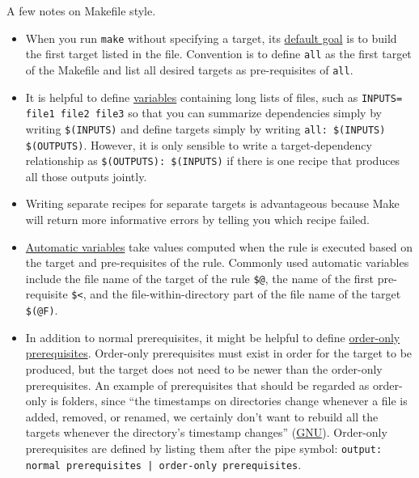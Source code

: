 A few notes on Makefile style.
\begin{itemize}
\item
When you run \texttt{make} without specifying a target,
its \href{https://www.gnu.org/software/make/manual/html_node/How-Make-Works.html#How-Make-Works}{default goal}
is to build the first target listed in the file.
Convention is to define \texttt{all} as the first target of the Makefile and list all desired targets as pre-requisites of \texttt{all}. 
\item It is helpful to define \href{https://www.gnu.org/software/make/manual/html_node/Variables-Simplify.html#Variables-Simplify}{variables} containing long lists of files, such as \texttt{INPUTS= file1 file2 file3}
so that you can summarize dependencies simply by writing \texttt{\$(INPUTS)}
and define targets simply by writing \texttt{all: \$(INPUTS) \$(OUTPUTS)}.
However, it is only sensible to write a target-dependency relationship as
\texttt{\$(OUTPUTS): \$(INPUTS)}
if there is one recipe that produces all those outputs jointly.
\item Writing separate recipes for separate targets is advantageous because Make will return more informative errors by telling you which recipe failed.
\item \href{https://www.gnu.org/software/make/manual/html_node/Automatic-Variables.html}{Automatic variables} take values computed when the rule is executed based on the target and pre-requisites of the rule.
Commonly used automatic variables include
the file name of the target of the rule \texttt{\$@},
the name of the first pre-requisite \texttt{\$<},
and
the file-within-directory part of the file name of the target \texttt{\$(@F)}.
\item In addition to normal prerequisites, it might be helpful to define \href{https://www.gnu.org/software/make/manual/html_node/Prerequisite-Types.html}{order-only prerequisites}.
Order-only prerequisites must exist in order for the target to be produced, but the target does not need to be newer than the order-only prerequisites.
An example of prerequisites that should be regarded as order-only is folders, since ``the timestamps on directories change whenever a file is added, removed, or renamed, we certainly don’t want to rebuild all the targets whenever the directory’s timestamp changes'' (\href{https://www.gnu.org/software/make/manual/html_node/Prerequisite-Types.html}{GNU}). 
Order-only prerequisites are defined by listing them after the pipe symbol: \texttt{output: normal prerequisites | order-only prerequisites}.

\end{itemize}
